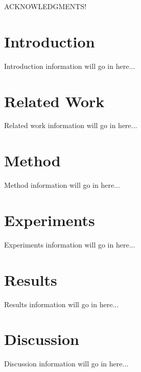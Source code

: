 \documentclass[11pt,oneside,a4paper,onecolumn]{article}                 %
\begin{document}
\pagebreak[4]




ACKNOWLEDGMENTS!

\pagebreak[4]


\section{Introduction}
Introduction information will go in here...

\section{Related Work}
Related work information will go in here...

\section{Method}
Method information will go in here...
  
\section{Experiments}
Experiments information will go in here...
  
\section{Results}
Results information will go in here...
  
\section{Discussion}
Discussion information will go in here...\cite{yan2007determining}\\ %
\pagebreak[4]

 
\end{document}
